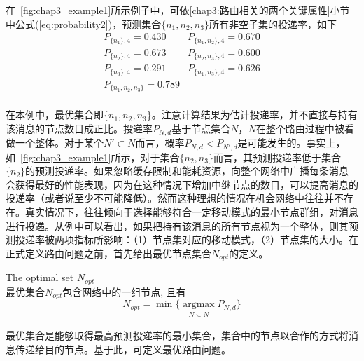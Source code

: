 在\figurename~\ref{fig:chap3_example1}所示例子中，可依\ref{chap3:路由相关的两个关键属性}小节中公式(\ref{eq:probability2})，预测集合$\{n_1,n_2,n_3\}$所有非空子集的投递率，如下
\[
\begin{array}{ll}
P_{\{n_1\},4}=0.430 & P_{\{n_1,n_2\},4}=0.670  \\
P_{\{n_2\},4}=0.673 & P_{\{n_2,n_3\},4}=0.600  \\
P_{\{n_3\},4}=0.291 & P_{\{n_1,n_3\},4}=0.626  \\
P_{\{n_1,n_2,n_3\}}=0.789\\
\end{array}
\]

在本例中，最优集合即$\{n_1,n_2,n_3\}$。注意计算结果为估计投递率，并不直接与持有该消息的节点数目成正比。投递率$P_{N,d}$基于节点集合$N$，$N$在整个路由过程中被看做一个整体。对于某个$N'\subset N$而言，概率$P_{N,d}<P_{N',d}$是可能发生的。事实上，如\figurename~\ref{fig:chap3_example1}所示，对于集合$\{n_2,n_3\}$而言，其预测投递率低于集合$\{n_2\}$的预测投递率。如果忽略缓存限制和能耗资源，向整个网络中广播每条消息会获得最好的性能表现，因为在这种情况下增加中继节点的数目，可以提高消息的投递率（或者说至少不可能降低）。然而这种理想的情况在机会网络中往往并不存在。真实情况下，往往倾向于选择能够符合一定移动模式的最小节点群组，对消息进行投递。从例中可以看出，如果把持有该消息的所有节点视为一个整体，则其预测投递率被两项指标所影响：（1）节点集对应的移动模式，（2）节点集的大小。在正式定义路由问题之前，首先给出最优节点集合$N_{opt}$的定义。

\begin{definition} The optimal set $N_{opt}$\\
最优集合$N_{opt}$包含网络中的一组节点, 且有
\begin{displaymath}
N_{opt}= \min\{\mathrel{\mathop{\arg\max}\limits_{N\subseteq \overline{N}}}P_{N,d}\}
\end{displaymath}
\end{definition}

最优集合是能够取得最高预测投递率的最小集合，集合中的节点以合作的方式将消息传递给目的节点。基于此，可定义最优路由问题。

